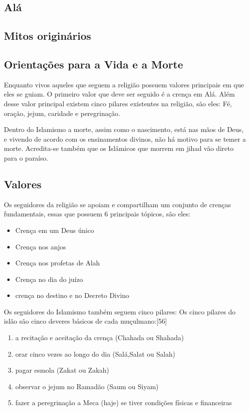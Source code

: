 \documentclass[12pt]{article}
\begin{document}
\subsection{Alá}
\subsection{Mitos originários}
\subsection{Orientações para a Vida e a Morte}
Enquanto vivos aqueles que seguem a religião possuem valores principais em que eles se guiam. O primeiro valor que deve ser seguido é a crença em Alá. Além desse valor principal existem cinco pilares existentes na religião, são eles: Fé, oração, jejum, caridade e peregrinação.
\par Dentro do Islamismo a morte, assim como o nascimento, está nas mãos de Deus, e vivendo de acordo com os ensinamentos divinos, não há motivo para se temer a morte. Acredita-se também que os Islâmicos que morrem em jihad vão direto para o paraíso.
\subsection{Valores}
Os seguidores da religião se apoiam e compartilham um conjunto de crenças fundamentais, essas que possuem 6 principais tópicos, são eles:
\begin{itemize}
    \item Crença em um Deus único
    \item Crença nos anjos
    \item Crença nos profetas de Alah
    \item Crença no dia do juízo
    \item crença no destino e no Decreto Divino
\end{itemize}
Os seguidores do Islamismo também seguem cinco pilares:
Os cinco pilares do islão são cinco deveres básicos de cada muçulmano:[56]

\begin{enumerate}
\item a recitação e aceitação da crença (Chahada ou Shahada)
\item orar cinco vezes ao longo do dia (Salá,Salat ou Salah)
\item pagar esmola (Zakat ou Zakah)
\item observar o jejum no Ramadão (Saum ou Siyam)
\item fazer a peregrinação a Meca (haje) se tiver condições físicas e financeiras
\end{enumerate}
\end{document}
